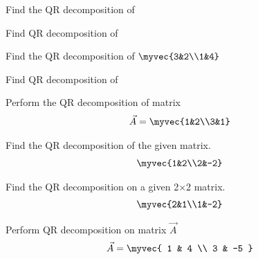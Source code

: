 
  

  \item Find the QR decomposition of 
\\
\solution


\item Find QR decomposition of 
\\
\solution

\item Find the QR decomposition of $\myvec{3&2\\1&4}$ 
\\
\solution

%
\item Find QR decomposition of 
\\
\solution

%
\item Perform the QR decomposition of matrix 
\begin{align}
 \vec{A}=\myvec{1&2\\3&1}
\end{align}
\solution

\item Find the QR decomposition of the given matrix.
\begin{align}
    \myvec{1&2\\2&-2}
\end{align}
\solution

%
\item Find the QR decomposition  on a given 2$\times$2 matrix. 
\begin{align}
    \myvec{2&1\\1&-2}
\end{align}
%
\solution

\item Perform QR decomposition on matrix $\vec{A}$
\begin{align}
    \vec{A}=\myvec{ 1 & 4 \\ 3 & -5 }\label{eq:solutions/decomp/2/21/givmat}
\end{align}
